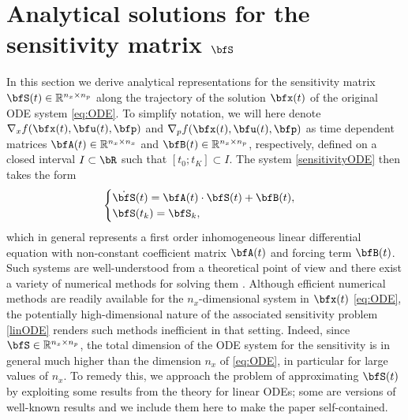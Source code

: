 \documentclass[DIV=12]{scrartcl} %
\newcommand{\pn}[1]{{\color{red}\textbf{PN}: #1}}
\theoremstyle{definition}
\begin{document}
\section{Analytical solutions for the sensitivity matrix $\bfS$}
\label{sec:method}
In this section we derive analytical representations for the sensitivity matrix $\bfS(t)\in\mathbb{R}^{n_x\times n_p}$ along the trajectory of the solution $\bfx(t)$ of the original ODE system \eqref{eq:ODE}. To simplify notation, we will here denote $\nabla_x f (\bfx(t), \bfu(t), \bfp)$ and $\nabla_p f(\bfx (t), \bfu(t), \bfp)$ as time dependent matrices $\bfA(t)\in\mathbb{R}^{n_x\times n_x}$ and $\bfB(t)\in\mathbb{R}^{n_x\times n_p}$, respectively, defined on a closed interval $I\subset\bR$ such that $[t_0;t_K]\subset I$. The system \eqref{sensitivityODE} then takes the form
\begin{equation}
\label{linODE}
    \begin{cases}
    \dot{\bfS}(t) = \bfA(t)\cdot \bfS(t) + \bfB(t),\\
    \bfS(t_{k})=\bfS_{k},
    \end{cases}
\end{equation}
which in general represents a first order inhomogeneous linear differential equation with non-constant coefficient matrix $\bfA(t)$ and forcing term $\bfB(t)$. Such systems are well-understood from a theoretical point of view \cite{BrockettRogerW.2015Fdls, RughWilsonJ1993Lst} and there exist a variety of numerical methods for solving them \cite{HNW93, HW10, GH10, SauerTim2006Na}. %
Although efficient numerical methods are readily available for the $n_x$-dimensional system in $\bfx(t)$ \eqref{eq:ODE}, the potentially high-dimensional nature of the associated sensitivity problem \eqref{linODE} renders such methods inefficient in that setting. Indeed, since $\bfS\in\mathbb{R}^{n_x\times n_p}$, the total dimension of the ODE system for the sensitivity is in general much higher than the dimension $n_x$ of \eqref{eq:ODE}, in particular for large values of $n_x$. To remedy this, we approach the problem of approximating $\bfS(t)$ by exploiting some results from the theory for linear ODEs; some are versions of well-known results and we include them here to make the paper self-contained.
\end{document}
